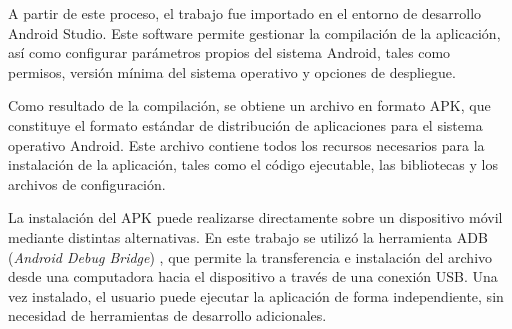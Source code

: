 A partir de este proceso, el trabajo fue importado en el entorno de
desarrollo Android Studio. Este software permite gestionar la
compilación de la aplicación, así como configurar parámetros propios
del sistema Android, tales como permisos, versión mínima del sistema
operativo y opciones de despliegue.

Como resultado de la compilación, se obtiene un archivo en formato APK, que constituye el formato estándar de distribución de aplicaciones para el sistema operativo Android. Este archivo contiene todos los recursos necesarios para la instalación de la aplicación, tales como el código ejecutable, las bibliotecas y los archivos de configuración.

La instalación del APK puede realizarse directamente sobre un
dispositivo móvil mediante distintas alternativas. En este trabajo se
utilizó la herramienta ADB (\textit{Android Debug Bridge}) \citep{web_adb}, que permite
la transferencia e instalación del archivo desde una computadora hacia
el dispositivo a través de una conexión USB. Una vez instalado, el
usuario puede ejecutar la aplicación de forma independiente, sin
necesidad de herramientas de desarrollo adicionales.